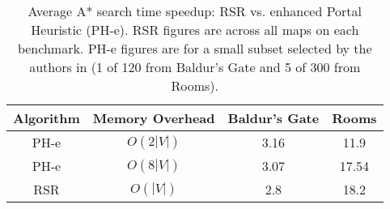 \begin{table}[tb]
\label{table:phspeedup}
\begin{center}
\begin{tabular}{|c|c|c|c|}
\hline
\textbf{Algorithm} & \textbf{Memory Overhead} & \textbf{Baldur's Gate} & \textbf{Rooms}  \\ \hline
PH-e & $O(2|V|)$ & 3.16 &  11.9 \\ \hline
PH-e & $O(8|V|)$ & 3.07 &  17.54 \\ \hline
RSR & $O(|V|)$ & 2.8 & 18.2 \\ \hline
\end{tabular}
\end{center}
\caption{Average A* search time speedup: RSR vs. enhanced Portal
Heuristic (PH-e). RSR figures are across all maps on each benchmark. PH-e
figures are for a small subset selected by the authors in \cite{goldenberg10} (1 of 120 from
Baldur's Gate and 5 of 300 from Rooms). }
\end{table}
